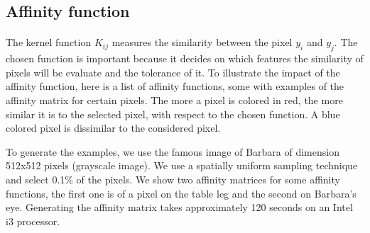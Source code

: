 \subsection{Affinity function}
\label{subsec:kernel-variations}

\paragraph{}
The kernel function \(K_{ij}\) measures the similarity between the pixel \(y_i\) and \(y_j\).
The chosen function is important because it decides on which features the similarity of pixels will be evaluate and the tolerance of it.
To illustrate the impact of the affinity function, here is a list of affinity functions, some with examples of the affinity matrix for certain pixels.
The more a pixel is colored in red, the more similar it is to the selected pixel, with respect to the chosen function.
A blue colored pixel is dissimilar to the considered pixel.

To generate the examples, we use the famous image of Barbara of dimension 512x512 pixels (grayscale image).
We use a spatially uniform sampling technique and select 0.1\% of the pixels.
We show two affinity matrices for some affinity functions, the first one is of a pixel on the table leg and the second on Barbara's eye.
Generating the affinity matrix takes approximately 120 seconds on an Intel i3 processor.

